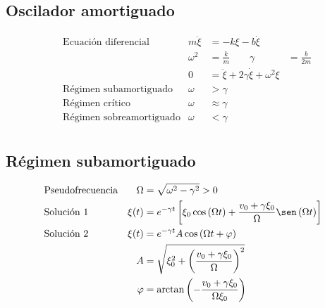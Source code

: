 \documentclass[a4paper, 8pt]{extarticle}
\begin{document}
\begin{multicols}{3}
  \section{Oscilador amortiguado}
  \begin{align*}
     & \text{Ecuación diferencial}     & m\ddot{\xi} & = -k\xi -b\dot{\xi}                                              \\
     &                                 & \omega ^2   & = \frac{k}{m} \qquad \gamma                     & = \frac{b}{2m} \\
     &                                 & 0           & = \ddot{\xi} + 2\gamma \dot{\xi} + \omega ^2\xi                  \\
     & \text{Régimen subamortiguado}   & \omega      & > \gamma                                                         \\
     & \text{Régimen crítico}          & \omega      & \approx \gamma                                                   \\
     & \text{Régimen sobreamortiguado} & \omega      & < \gamma                                                         \\
  \end{align*}
  \subsection{Régimen subamortiguado}
  \begin{align*}
     & \text{Pseudofrecuencia} & \Omega  & = \sqrt{\omega ^2 - \gamma ^2} > 0                                                                                                  \\
     & \text{Solución 1}       & \xi (t) & = e^{- \gamma t} \left[ \xi _0 \cos \left( \Omega t \right) + \frac{v_0+\gamma \xi _0}{\Omega} \sen \left( \Omega t \right) \right] \\
     & \text{Solución 2}       & \xi (t) & = e^{-\gamma t} A \cos \left( \Omega t + \varphi \right)                                                                            \\
     &                         & A       & = \sqrt{\xi _0^2 + \left( \frac{v_0+\gamma\xi _0}{\Omega} \right)^2}                                                                \\
     &                         & \varphi & = \arctan \left( - \frac{v_0 + \gamma\xi _0}{\Omega\xi _0} \right)                                                                  \\
  \end{align*}

\end{multicols}
\end{document}
